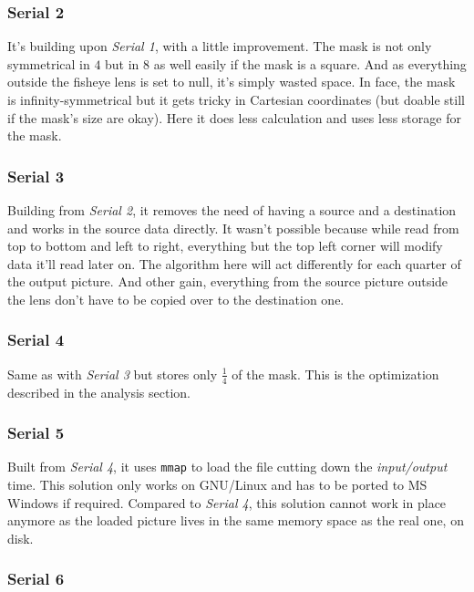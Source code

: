 \documentclass[10pt,a4paper]{article}
\begin{document}
\subsubsection{Serial 2}

It’s building upon \emph{Serial 1}, with a little improvement. The mask is not
only symmetrical in $4$ but in $8$ as well easily if the mask is a square. And
as everything outside the fisheye lens is set to null, it's simply wasted
space. In face, the mask is infinity-symmetrical but it gets tricky in
Cartesian coordinates (but doable still if the mask's size are okay). Here it
does less calculation and uses less storage for the mask.

\subsubsection{Serial 3}

Building from \emph{Serial 2}, it removes the need of having a source and a
destination and works in the source data directly. It wasn't possible because
while read from top to bottom and left to right, everything but the top left
corner will modify data it’ll read later on. The algorithm here will act
differently for each quarter of the output picture. And other gain, everything
from the source picture outside the lens don't have to be copied over to the
destination one.

\subsubsection{Serial 4}

Same as with \emph{Serial 3} but stores only $\frac{1}{4}$ of the mask. This is
the optimization described in the analysis section.

\subsubsection{Serial 5}

Built from \emph{Serial 4}, it uses \verb|mmap| to load the file cutting down
the \emph{input/output} time. This solution only works on GNU/Linux and has to
be ported to MS Windows if required. Compared to \emph{Serial 4}, this solution
cannot work in place anymore as the loaded picture lives in the same memory
space as the real one, on disk.

\subsubsection{Serial 6}
\end{document}
